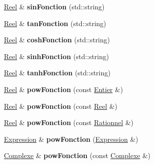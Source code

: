 \begin{DoxyCompactItemize}
\item 
\hypertarget{class_reel_a161e78d47946bf8c378fe3557e48216e}{\hyperlink{class_reel}{Reel} \& {\bfseries sin\-Fonction} (std\-::string)}\label{class_reel_a161e78d47946bf8c378fe3557e48216e}

\item 
\hypertarget{class_reel_aa3255623962ac83582e8f03ec13a46a5}{\hyperlink{class_reel}{Reel} \& {\bfseries tan\-Fonction} (std\-::string)}\label{class_reel_aa3255623962ac83582e8f03ec13a46a5}

\item 
\hypertarget{class_reel_abe5066f774acbc7da0079140fbd9241d}{\hyperlink{class_reel}{Reel} \& {\bfseries cosh\-Fonction} (std\-::string)}\label{class_reel_abe5066f774acbc7da0079140fbd9241d}

\item 
\hypertarget{class_reel_a477be70385a7b3c9fbd7262da79caed0}{\hyperlink{class_reel}{Reel} \& {\bfseries sinh\-Fonction} (std\-::string)}\label{class_reel_a477be70385a7b3c9fbd7262da79caed0}

\item 
\hypertarget{class_reel_a05e059ba72c006f0591018be209e9288}{\hyperlink{class_reel}{Reel} \& {\bfseries tanh\-Fonction} (std\-::string)}\label{class_reel_a05e059ba72c006f0591018be209e9288}

\item 
\hypertarget{class_reel_a46c360be20bcb968e8b885322caf84b9}{\hyperlink{class_reel}{Reel} \& {\bfseries pow\-Fonction} (const \hyperlink{class_entier}{Entier} \&)}\label{class_reel_a46c360be20bcb968e8b885322caf84b9}

\item 
\hypertarget{class_reel_adf1996a2b7dd40325244f9b431eaf814}{\hyperlink{class_reel}{Reel} \& {\bfseries pow\-Fonction} (const \hyperlink{class_reel}{Reel} \&)}\label{class_reel_adf1996a2b7dd40325244f9b431eaf814}

\item 
\hypertarget{class_reel_aac5ad375e6922490462f10e367302117}{\hyperlink{class_reel}{Reel} \& {\bfseries pow\-Fonction} (const \hyperlink{class_rationnel}{Rationnel} \&)}\label{class_reel_aac5ad375e6922490462f10e367302117}

\item 
\hypertarget{class_reel_a446db9edc845242557b6b06ad55e386d}{\hyperlink{class_expression}{Expression} \& {\bfseries pow\-Fonction} (\hyperlink{class_expression}{Expression} \&)}\label{class_reel_a446db9edc845242557b6b06ad55e386d}

\item 
\hypertarget{class_reel_a86cf7d11bb08bf03236bfa90355a921a}{\hyperlink{class_complexe}{Complexe} \& {\bfseries pow\-Fonction} (const \hyperlink{class_complexe}{Complexe} \&)}\label{class_reel_a86cf7d11bb08bf03236bfa90355a921a}

\end{DoxyCompactItemize}


